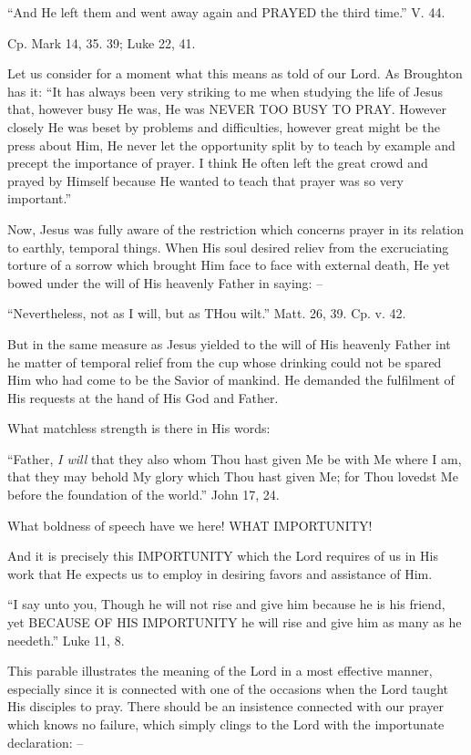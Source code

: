 \documentclass[
]{book}
\begin{document}
``And He left them and went away again and PRAYED the third time.'' V. 44.

Cp. Mark 14, 35. 39; Luke 22, 41.

Let us consider for a moment what this means as told of our Lord. As Broughton has it: ``It has always been very striking to me when studying the life of Jesus that, however busy He was, He was NEVER TOO BUSY TO PRAY. However closely He was beset by problems and difficulties, however great might be the press about Him, He never let the opportunity split by to teach by example and precept the importance of prayer. I think He often left the great crowd and prayed by Himself because He wanted to teach that prayer was so very important.''

Now, Jesus was fully aware of the restriction which concerns prayer in its relation to earthly, temporal things. When His soul desired reliev from the excruciating torture of a sorrow which brought Him face to face with external death, He yet bowed under the will of His heavenly Father in saying: --

``Nevertheless, not as I will, but as THou wilt.'' Matt. 26, 39. Cp. v. 42.

But in the same measure as Jesus yielded to the will of His heavenly Father int he matter of temporal relief from the cup whose drinking could not be spared Him who had come to be the Savior of mankind. He demanded the fulfilment of His requests at the hand of His God and Father.

What matchless strength is there in His words:

``Father, \emph{I will} that they also whom Thou hast given Me be with Me where I am, that they may behold My glory which Thou hast given Me; for Thou lovedst Me before the foundation of the world.'' John 17, 24.

What boldness of speech have we here! WHAT IMPORTUNITY!

And it is precisely this IMPORTUNITY which the Lord requires of us in His work that He expects us to employ in desiring favors and assistance of Him.

``I say unto you, Though he will not rise and give him because he is his friend, yet BECAUSE OF HIS IMPORTUNITY he will rise and give him as many as he needeth.'' Luke 11, 8.

This parable illustrates the meaning of the Lord in a most effective manner, especially since it is connected with one of the occasions when the Lord taught His disciples to pray. There should be an insistence connected with our prayer which knows no failure, which simply clings to the Lord with the importunate declaration: --
\end{document}
